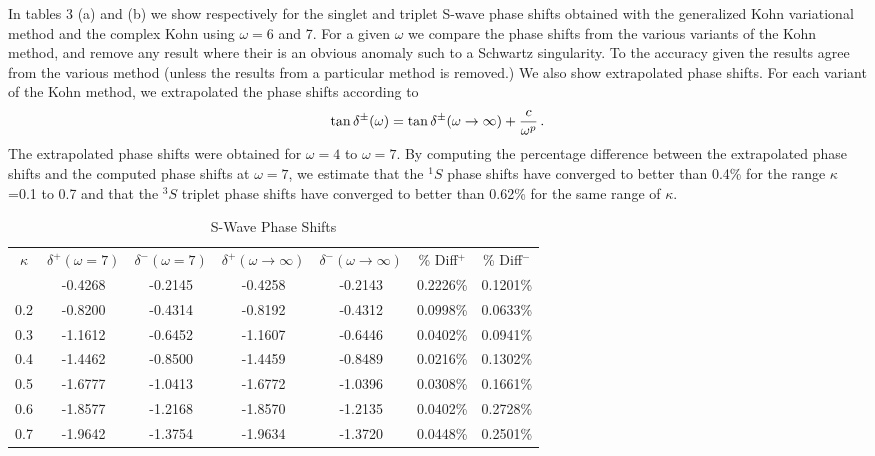 \documentclass[preprint,showpacs,preprintnumbers,amsmath,amssymb]{revtex4}
\def \bea{\begin{eqnarray}}
\def \eea{\end{eqnarray}}
\begin{document}
In tables 3 (a) and (b) we show respectively for the singlet
and triplet S-wave phase shifts 
obtained with the generalized Kohn variational
method and the complex Kohn using $\omega=6$ and 7.
For a given $\omega$ we compare the phase shifts from
the various variants of the Kohn method,
and remove any result where their is an obvious
anomaly such to a Schwartz singularity.
To the accuracy given the results agree from
the various method (unless the results
from  a particular method is removed.)
We also show extrapolated phase shifts.
For each variant of the Kohn method,
we extrapolated the phase shifts according
to 
\bea
\tan\delta^\pm(\omega) = \tan\delta^\pm(\omega\to\infty) + {c\over \omega^p}\, .
\eea
The extrapolated phase shifts were obtained for
$\omega=4$ to $\omega =7$.
By computing the percentage difference between the extrapolated phase shifts
and the computed phase shifts at $\omega =7$, we estimate
that the $^1S$ phase shifts have converged to better than 0.4\%
for the range $\kappa$ =0.1 to 0.7 and that the $^3S$ triplet
phase shifts have converged to better than  0.62\% 
for the same range of $\kappa$.


\begin{table}
\centering
\begin{ruledtabular}
\begin{tabular}{c c c c c c c}
$\kappa$ & $\delta^+ (\omega = 7)$ & $\delta^- (\omega = 7)$ & $\delta^+ (\omega \rightarrow \infty)$ & $\delta^- (\omega \rightarrow \infty)$ & \% Diff$^+$ & \% Diff$^-$ \\
\colrule
0.1 & -0.4268 & -0.2145 & -0.4258 & -0.2143 & 0.2226\% & 0.1201\% \\
0.2 & -0.8200 & -0.4314 & -0.8192 & -0.4312 & 0.0998\% & 0.0633\% \\
0.3 & -1.1612 & -0.6452 & -1.1607 & -0.6446 & 0.0402\% & 0.0941\% \\
0.4 & -1.4462 & -0.8500 & -1.4459 & -0.8489 & 0.0216\% & 0.1302\% \\
0.5 & -1.6777 & -1.0413 & -1.6772 & -1.0396 & 0.0308\% & 0.1661\% \\
0.6 & -1.8577 & -1.2168 & -1.8570 & -1.2135 & 0.0402\% & 0.2728\% \\
0.7 & -1.9642 & -1.3754 & -1.9634 & -1.3720 & 0.0448\% & 0.2501\% \\
\end{tabular}
\end{ruledtabular}
\caption{S-Wave Phase Shifts}
\label{tab:SWavePhase}
\end{table}
\end{document}
